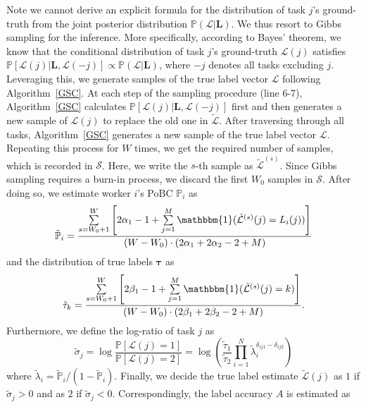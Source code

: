 Note we cannot derive an explicit formula for the distribution of task $j$'s ground-truth from the joint posterior distribution $\mathbb{P}(\mathcal{L}|\bm{L})$. We thus resort to Gibbs sampling for the inference.
More specifically, according to Bayes' theorem, we know that the conditional distribution of task $j$'s ground-truth $\mathcal{L}(j)$ satisfies
$\mathbb{P}[\mathcal{L}(j)|\bm{L}, \mathcal{L}(-j)]\propto \mathbb{P}(\mathcal{L}|\bm{L})$, where $-j$ denotes all tasks excluding $j$.
Leveraging this, we generate samples of the true label vector $\mathcal{L}$ following Algorithm~\ref{GSC}.
At each step of the sampling procedure (line 6-7), Algorithm~\ref{GSC} calculates $\mathbb{P}[\mathcal{L}(j)|\bm{L}, \mathcal{L}(-j)]$ first and then generates a new sample of $\mathcal{L}(j)$ to replace the old one in $\tilde{\mathcal{L}}$.
After traversing through all tasks, Algorithm~\ref{GSC} generates a new sample of the true label vector $\mathcal{L}$.
Repeating this process for $W$ times, we get the required number of samples, which is recorded in $\mathcal{S}$.
Here, we write the $s$-th sample as $\tilde{\mathcal{L}}^{(s)}$.
Since Gibbs sampling requires a burn-in process, we discard the first $W_0$ samples in $\mathcal{S}$. After doing so, we estimate worker $i$'s PoBC $\mathbb{P}_i$ as
\begin{equation}
\label{equation:p_infer}
\tilde{\mathbb{P}}_{i}=\frac{\sum\limits_{s=W_0+1}^{W}\left[2\alpha_{1}-1+\sum\limits_{j=1}^{M}\mathbbm{1}(\tilde{\mathcal{L}}^{(s)}(j)=L_{i}(j))\right]}{(W-W_0)\cdot(2\alpha_{1}+2\alpha_{2}-2+M)}
\end{equation}
and the distribution of true labels $\bm{\tau}$ as
\begin{equation}
\label{tau_infer}
\tilde{\tau}_{k}=\frac{\sum\limits_{s=W_0+1}^{W}\left[2\beta_{1}-1+\sum\limits_{j=1}^{M}\mathbbm{1}(\tilde{\mathcal{L}}^{(s)}(j)=k)\right]}{(W-W_0)\cdot(2\beta_{1}+2\beta_{2}-2+M)}.
\end{equation}
Furthermore, we define the log-ratio of task $j$ as
\begin{equation}
\label{ProbRatio}
\tilde{\sigma}_j=\log\frac{\mathbb{P}[\mathcal{L}(j)=1]}{\mathbb{P}[\mathcal{L}(j)=2]}=\log\left(\frac{\tilde{\tau}_1}{\tilde{\tau}_2}\prod_{i=1}^{N}\tilde{\lambda}_i^{\delta_{ij1}-\delta_{ij2}}\right)
\end{equation}
where $\tilde{\lambda}_i = \tilde{\mathbb{P}}_i/(1-\tilde{\mathbb{P}}_i)$.
Finally, we decide the true label estimate $\tilde{\mathcal{L}}(j)$ as $1$ if $\tilde{\sigma}_j>0$ and as $2$ if $\tilde{\sigma}_j<0$.
Correspondingly, the label accuracy $A$ is estimated as
